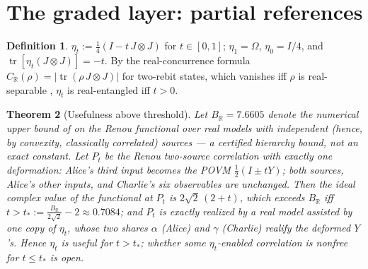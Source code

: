 \documentclass[11pt]{article}
\theoremstyle{plain}
\newtheorem{theorem}{Theorem}[section]
\theoremstyle{definition}
\newtheorem{definition}[theorem]{Definition}
\theoremstyle{remark}
\theoremstyle{plain}
\newcommand{\tr}{\operatorname{tr}}
\newcommand{\R}{\mathbb{R}}
\newcommand{\Om}{\Omega}
\begin{document}
\section{The graded layer: partial references}\label{sec:graded}

\begin{definition}\label{def:eta}
$\eta_t := \tfrac14(I - t\,J\otimes J)$ for $t\in[0,1]$;
$\eta_1 = \Om$, $\eta_0 = I/4$, and
$\tr[\eta_t(J\otimes J)] = -t$. By the real-concurrence formula
$C_\R(\rho) = |\tr(\rho\,J\otimes J)|$ for two-rebit states, which
vanishes iff $\rho$ is real-separable \cite{cfr2001}, $\eta_t$ is
real-entangled iff $t>0$.
\end{definition}

\begin{theorem}[Usefulness above threshold]\label{thm:etauseful}
Let $B_\R = 7.6605$ denote the numerical upper bound of
\cite{renou2021} on the Renou functional over real models with
independent (hence, by convexity, classically correlated) sources
--- a certified hierarchy bound, not an exact constant. Let $P_t$
be the Renou two-source correlation with exactly one deformation:
Alice's third input becomes the POVM $\tfrac12(I\pm tY)$; both
sources, Alice's other inputs, and Charlie's six observables are
unchanged. Then the ideal complex value of the functional at
$P_t$ is $2\sqrt2\,(2+t)$, which exceeds $B_\R$ iff
$t > t_* := \tfrac{B_\R}{2\sqrt2} - 2 \approx 0.7084$; and $P_t$
is exactly realized by a real model assisted by one copy of
$\eta_t$, whose two shares $\alpha$ (Alice) and $\gamma$ (Charlie)
realify the deformed $Y$'s. Hence $\eta_t$ is useful for
$t > t_*$; whether some $\eta_t$-enabled correlation is nonfree
for $t\le t_*$ is open.
\end{theorem}
\end{document}
